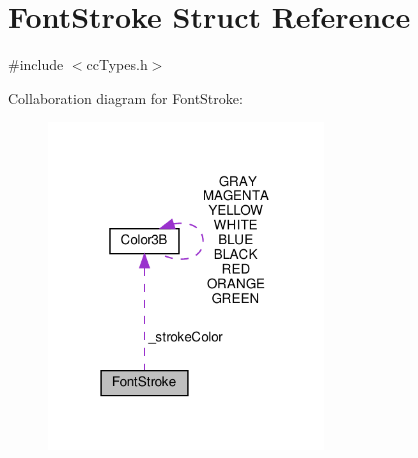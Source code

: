 \hypertarget{structFontStroke}{}\section{Font\+Stroke Struct Reference}
\label{structFontStroke}


{\ttfamily \#include $<$cc\+Types.\+h$>$}



Collaboration diagram for Font\+Stroke\+:
\nopagebreak
\begin{figure}[H]
\begin{center}
\leavevmode
\includegraphics[width=207pt]{structFontStroke__coll__graph}
\end{center}
\end{figure}
